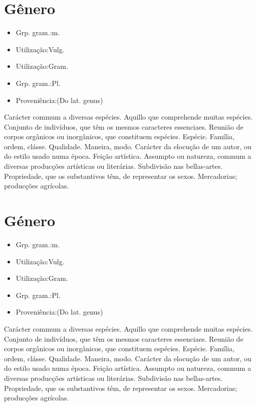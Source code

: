 \section{Gênero}
\begin{itemize}
\item {Grp. gram.:m.}
\end{itemize}
\begin{itemize}
\item {Utilização:Vulg.}
\end{itemize}
\begin{itemize}
\item {Utilização:Gram.}
\end{itemize}
\begin{itemize}
\item {Grp. gram.:Pl.}
\end{itemize}
\begin{itemize}
\item {Proveniência:(Do lat. \textunderscore genus\textunderscore )}
\end{itemize}
Carácter commum a diversas espécies.
Aquillo que comprehende muitas espécies.
Conjunto de indivíduos, que têm os mesmos caracteres essenciaes.
Reunião de corpos orgânicos ou inorgânicos, que constituem espécies.
Espécie.
Família, ordem, clásse.
Qualidade.
Maneira, modo.
Carácter da elocução de um autor, ou do estilo usado numa época.
Feição artística.
Assumpto ou natureza, commum a diversas producções artísticas ou literárias.
Subdivisão nas bellas-artes.
Propriedade, que os substantivos têm, de representar os sexos.
Mercadorias; producções agrícolas.
\section{Género}
\begin{itemize}
\item {Grp. gram.:m.}
\end{itemize}
\begin{itemize}
\item {Utilização:Vulg.}
\end{itemize}
\begin{itemize}
\item {Utilização:Gram.}
\end{itemize}
\begin{itemize}
\item {Grp. gram.:Pl.}
\end{itemize}
\begin{itemize}
\item {Proveniência:(Do lat. \textunderscore genus\textunderscore )}
\end{itemize}
Carácter commum a diversas espécies.
Aquillo que comprehende muitas espécies.
Conjunto de indivíduos, que têm os mesmos caracteres essenciaes.
Reunião de corpos orgânicos ou inorgânicos, que constituem espécies.
Espécie.
Família, ordem, clásse.
Qualidade.
Maneira, modo.
Carácter da elocução de um autor, ou do estilo usado numa época.
Feição artística.
Assumpto ou natureza, commum a diversas producções artísticas ou literárias.
Subdivisão nas bellas-artes.
Propriedade, que os substantivos têm, de representar os sexos.
Mercadorias; producções agrícolas.
